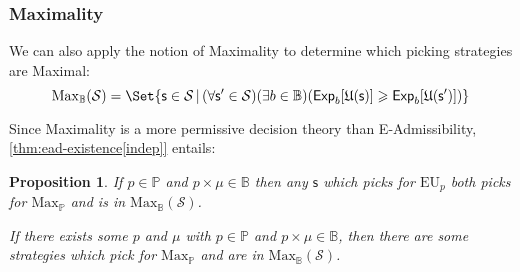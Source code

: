 \documentclass[a4paper]{article}
\newtheorem{proposition}[theorem]{Proposition}
\renewcommand\P{\mathbb{P}} %
\newcommand\Exp{\mathsf{Exp}}
\newcommand\EU{\mathrm{EU}}
\newcommand\EAd{\mathrm{EAd}}
\newcommand\U{\mathfrak{U}} %
\newcommand\Maximality{\mathrm{Max}}
\renewcommand\S{\mathcal{S}}
\newcommand\s{\mathsf{s}}
\newcommand{\IB}{\mathbb{B}}
\newcommand{\IP}{\P}
\renewcommand{\color}[1]{}
\newenvironment{colored}[1]{\leavevmode\color{#1}}{}
\newcommand{\Strategies}{\S}
\newcommand\SetDelimiter[1][]{
	\nonscript\,#1\vert \allowbreak \nonscript\,\mathopen{}}
\providecommand\given{\SetDelimiter}
\renewcommand{\geq}{\geqslant}
\newenvironment{CCM rewritten}
{\begingroup\color{blue}} %
{\endgroup}              %
\begin{document}
	\subsubsection{Maximality}
	We can also apply the notion of Maximality to determine which picking strategies are Maximal: 
	$$\Maximality_\IB(\S)=\Set{\s\in\S\given (\forall \s'\in\S)(\exists b\in\IB)(\Exp_b[\U(\s)]\geq\Exp_b[\U(\s')])}$$
	
Since Maximality is a more permissive decision theory than E-Admissibility, \cref{thm:ead-existence[indep]} entails:


%	

	 \begin{proposition}\label{thm:max-suff}
	If $p\in\IP$ and $p\times\mu\in\IB$ then any $\s$ which picks for $\EU_p$ both picks for $\Maximality_\IP$ and is in $\Maximality_\IB(\S)$. 
	
	If there exists some $p$ and $\mu$ with $p\in\IP$ and $p\times\mu\in\IB$, then there are some strategies which pick for $\Maximality_\IP$ and are in $\Maximality_\IB(\S)$. 
\end{proposition}

\begin{comment}
Since Maximality is a more permissive decision theory than E-Admissibility, \cref{thm:ead-equiv[indep]} entails:



\begin{proposition}\label{thm:max-suff}
	If $\s$ picks for $\EU_p$, for some $p$ in $\IP$ with some $p\times \mu\in \IB$, then $\s$ picks for $\Maximality_\IP$ and $\s$ is in $\Maximality_\IB(\Strategies)$.
%	
\end{proposition}
\end{comment}
\end{document}

